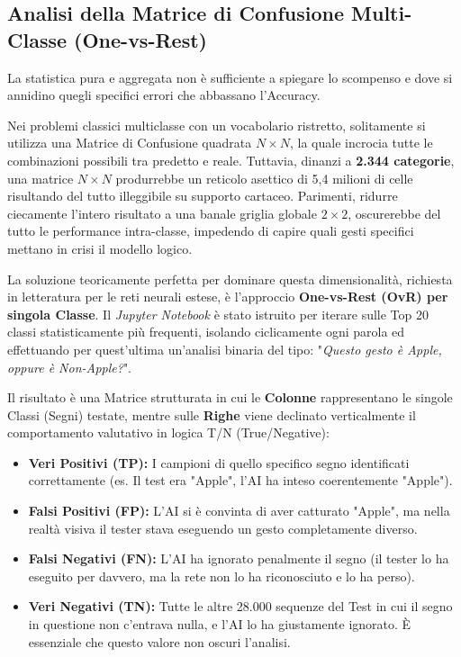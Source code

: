 \subsection{Analisi della Matrice di Confusione Multi-Classe (One-vs-Rest)}
La statistica pura e aggregata non è sufficiente a spiegare lo scompenso e dove si annidino quegli specifici errori che abbassano l'Accuracy. 

Nei problemi classici multiclasse con un vocabolario ristretto, solitamente si utilizza una Matrice di Confusione quadrata $N \times N$, la quale incrocia tutte le combinazioni possibili tra predetto e reale. Tuttavia, dinanzi a \textbf{2.344 categorie}, una matrice $N \times N$ produrrebbe un reticolo asettico di 5,4 milioni di celle risultando del tutto illeggibile su supporto cartaceo. Parimenti, ridurre ciecamente l'intero risultato a una banale griglia globale $2 \times 2$, oscurerebbe del tutto le performance intra-classe, impedendo di capire quali gesti specifici mettano in crisi il modello logico.

La soluzione teoricamente perfetta per dominare questa dimensionalità, richiesta in letteratura per le reti neurali estese, è l'approccio \textbf{One-vs-Rest (OvR) per singola Classe}. 
Il \textit{Jupyter Notebook} è stato istruito per iterare sulle Top 20 classi statisticamente più frequenti, isolando ciclicamente ogni parola ed effettuando per quest'ultima un'analisi binaria del tipo: "\textit{Questo gesto è Apple, oppure è Non-Apple?}". 

Il risultato è una Matrice strutturata in cui le \textbf{Colonne} rappresentano le singole Classi (Segni) testate, mentre sulle \textbf{Righe} viene declinato verticalmente il comportamento valutativo in logica T/N (True/Negative):
\begin{itemize}
    \item \textbf{Veri Positivi (TP):} I campioni di quello specifico segno identificati correttamente (es. Il test era "Apple", l'AI ha inteso coerentemente "Apple").
    \item \textbf{Falsi Positivi (FP):} L'AI si è convinta di aver catturato "Apple", ma nella realtà visiva il tester stava eseguendo un gesto completamente diverso. 
    \item \textbf{Falsi Negativi (FN):} L'AI ha ignorato penalmente il segno (il tester lo ha eseguito per davvero, ma la rete non lo ha riconosciuto e lo ha perso).
    \item \textbf{Veri Negativi (TN):} Tutte le altre 28.000 sequenze del Test in cui il segno in questione non c'entrava nulla, e l'AI lo ha giustamente ignorato. È essenziale che questo valore non oscuri l'analisi.
\end{itemize}

